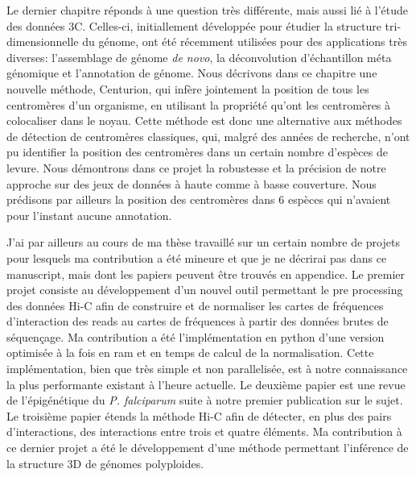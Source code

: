 \begin{resumes}
Le dernier chapitre réponds à une question très différente, mais aussi lié à
l'étude des données 3C. Celles-ci, initiallement développée pour étudier la
structure tri-dimensionnelle du génome, ont été récemment utilisées pour des
applications très diverses: l'assemblage de génome {\em de novo}, la
déconvolution d'échantillon méta génomique et l'annotation de génome. Nous
décrivons dans ce chapitre une nouvelle méthode, Centurion, qui infère
jointement la position de tous les centromères d'un organisme, en utilisant la
propriété qu'ont les centromères à colocaliser dans le noyau. Cette méthode
est donc une alternative aux méthodes de détection de centromères classiques,
qui, malgré des années de recherche, n'ont pu identifier la position des
centromères dans un certain nombre d'espèces de levure. Nous démontrons dans ce
projet la robustesse et la précision de notre approche sur des jeux de données
à haute comme à basse couverture. Nous prédisons par ailleurs la position des
centromères dans 6 espèces qui n'avaient pour l'instant aucune annotation.

J'ai par ailleurs au cours de ma thèse travaillé sur un certain nombre de
projets pour lesquels ma contribution a été mineure et que je ne décrirai pas
dans ce manuscript, mais dont les papiers peuvent être trouvés en appendice.
Le premier projet consiste au développement d'un nouvel outil permettant le
pre processing des données Hi-C afin de construire et de normaliser les cartes de fréquences
d'interaction des reads au cartes de fréquences à partir des données brutes de
séquençage. Ma contribution a été l'implémentation en python d'une version
optimisée à la fois en ram et en temps de calcul de la normalisation. Cette
implémentation, bien que très simple et non parallelisée, est à
notre connaissance la plus performante existant à l'heure actuelle. Le
deuxième papier est une revue de l'épigénétique du {\em P. falciparum} suite à
notre premier publication sur le sujet. Le troisième papier étends la méthode
Hi-C afin de détecter, en plus des pairs d'interactions, des interactions
entre trois et quatre éléments. Ma contribution à ce dernier projet a été le
développement d'une méthode permettant l'inférence de la structure 3D de
génomes polyploides.

\end{resumes}


